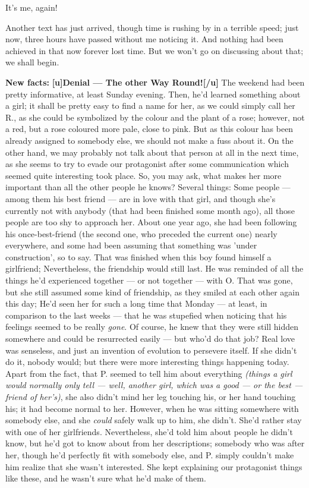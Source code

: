 It's me, again!

Another text has just arrived, though time is rushing by in a terrible speed; just now, three hours have passed without me noticing it. And nothing had been achieved in that now forever lost time. But we won't go on discussing about that; we shall begin. 

\textbf{New facts:}
\textbf{[u]Denial --- The other Way Round![/u]}
The weekend had been pretty informative, at least Sunday evening. Then, he'd learned something about a girl; it shall be pretty easy to find a name for her, as we could simply call her R., as she could be symbolized by the colour and the plant of a rose; however, not a red, but a rose coloured more pale, close to pink. But as this colour has been already assigned to somebody else, we should not make a fuss about it. On the other hand, we may probably not talk about that person at all in the next time, as she seems to try to evade our protagonist after some communication which seemed quite interesting took place. So, you may ask, what makes her more important than all the other people he knows? Several things: Some people --- among them his best friend --- are in love with that girl, and though she's currently not with anybody (that had been finished some month ago), all those people are too shy to approach her. About one year ago, she had been following his once-best-friend (the second one, who preceded the current one) nearly everywhere, and some had been assuming that something was 'under construction', so to say. That was finished when this boy found himself a girlfriend; Nevertheless, the friendship would still last. 
He was reminded of all the things he'd experienced together --- or not together --- with O. That was gone, but she still assumed some kind of friendship, as they smiled at each other again this day; He'd seen her for such a long time that Monday --- at least, in comparison to the last weeks --- that he was stupefied when noticing that his feelings seemed to be really \emph{gone}. Of course, he knew that they were still hidden somewhere and could be resurrected easily --- but who'd do that job?
Real love was senseless, and just an invention of evolution to persevere itself. 
If she didn't do it, nobody would; but there were more interesting things happening today. Apart from the fact, that P. seemed to tell him about everything \emph{(things a girl would normally only tell --- well, another girl, which was a good --- or the best --- friend of her's)}, she also didn't mind her leg touching his, or her hand touching his; it had become normal to her. However, when he was sitting somewhere with somebody else, and she \emph{could} safely walk up to him, she didn't. She'd rather stay with one of her girlfriends. Nevertheless, she'd told him about people he didn't know, but he'd got to know about from her descriptions; somebody who was after her, though he'd perfectly fit with somebody else, and P. simply couldn't make him realize that she wasn't interested. She kept explaining our protagonist things like these, and he wasn't sure what he'd make of them. 

